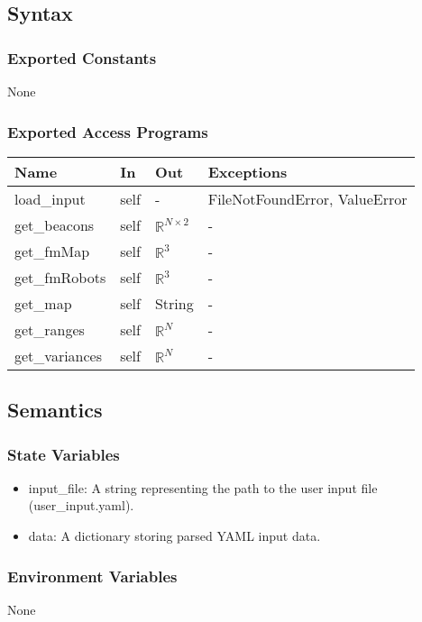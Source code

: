 \documentclass[12pt, titlepage]{article}
\begin{document}
\subsection{Syntax}

\subsubsection{Exported Constants}
None
\subsubsection{Exported Access Programs}

\begin{center}
\begin{tabular}{p{3cm} p{2cm} p{2cm} p{4cm}}
\hline
\textbf{Name} & \textbf{In} & \textbf{Out} & \textbf{Exceptions} \\
\hline
load\_input & self & -& FileNotFoundError, ValueError \\
get\_beacons& self & $\mathbb{R}^{N \times 2}$ & - \\
get\_fmMap& self & $\mathbb{R}^3$ & - \\
get\_fmRobots& self & $\mathbb{R}^3$ & - \\
get\_map& self & String & - \\
get\_ranges& self & $\mathbb{R}^N$ & - \\
get\_variances& self & $\mathbb{R}^N$ & - \\
\hline
\end{tabular}
\end{center}

\subsection{Semantics}

\subsubsection{State Variables}
\begin{itemize}
  \item input\_file: A string representing the path to the user input file (user\_input.yaml).
  \item data: A dictionary storing parsed YAML input data.
\end{itemize}

\subsubsection{Environment Variables}
None
\end{document}
